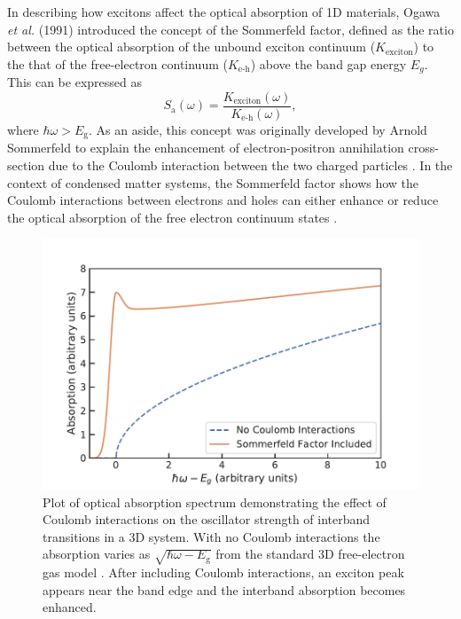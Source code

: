 In describing how excitons affect the optical absorption of 1D materials, Ogawa \textit{et al.} (1991) introduced the concept of the Sommerfeld factor, defined as the ratio between the optical absorption of the unbound exciton continuum ($K_\text{exciton}$) to the that of the free-electron continuum ($K_\text{e-h}$) above the band gap energy $E_g$. This can be expressed as
\begin{equation}
	S_\text{a} (\omega) = \frac{K_\text{exciton}(\omega)}{K_\text{e-h}(\omega)},
\end{equation}
where $\hbar \omega > E_\text{g}$. As an aside, this concept was originally developed by Arnold Sommerfeld to explain the enhancement of electron-positron annihilation cross-section due to the Coulomb interaction between the two charged particles \cite{sommerfeld1931beugung}. In the context of condensed matter systems, the Sommerfeld factor shows how the Coulomb interactions between electrons and holes can either enhance or reduce the optical absorption of the free electron continuum states \cite{ogawa1991interband}.

\begin{figure}[ht]
	\centering
	\includegraphics[scale=0.8]{images/chapter_optical_props/Sommerfeld_Plot/coulomb_enhancement}
	\caption{Plot of optical absorption spectrum demonstrating the effect of Coulomb interactions on the oscillator strength of interband transitions in a 3D system. With no Coulomb interactions the absorption varies as $\sqrt{\hbar\omega - E_\text{g}}$ from the standard 3D free-electron gas model \cite{Ashcroft}. After including Coulomb interactions, an exciton peak appears near the band edge and the interband absorption becomes enhanced.}
	\label{fig:coulomb_enhancement_3d}
\end{figure}

